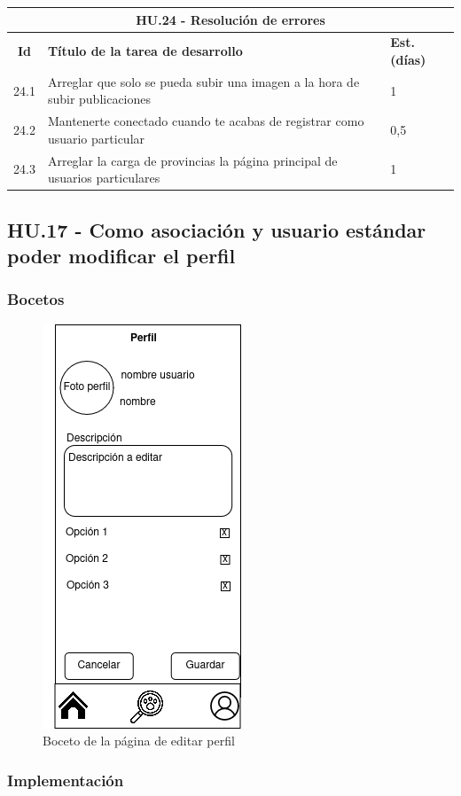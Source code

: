 \begin{table}[H]
	\centering
\begin{tabular}{|c|p{9.5cm}|p{1cm}|}
	\hline
	\multicolumn{3}{|c|}{\textbf{HU.24 - Resolución de errores}} \\
	\hline
	\textbf{Id} & \textbf{Título de la tarea de desarrollo} & \textbf{Est. (días)} \\
	\hline
	24.1 & Arreglar que solo se pueda subir una imagen a la hora de subir publicaciones  & 1 \\ \hline
	24.2 & Mantenerte conectado cuando te acabas de registrar como usuario particular & 0,5 \\ \hline
	24.3 & Arreglar la carga de provincias la página principal de usuarios particulares & 1 \\ \hline
\end{tabular}
\end{table}


\subsection{HU.17 - Como asociación y usuario estándar poder modificar el perfil}

\subsubsection{Bocetos}

\begin{figure}[H]
	\centering
	\includegraphics[width=0.31\linewidth]{"sprint 4/hu17/editarPerfil"}
	\caption{Boceto de la página de editar perfil}
	\label{fig:editarperfil}
\end{figure}

\subsubsection{Implementación}


